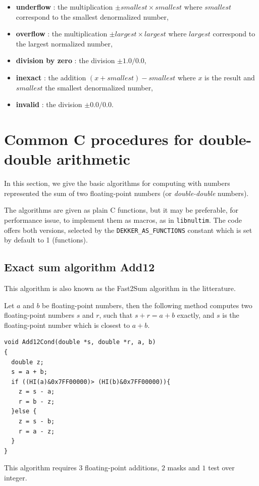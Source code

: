 \begin{itemize}
\item {\bf underflow} : the multiplication $\pm smallest \times smallest$ where $smallest$ correspond to the smallest denormalized number,
\item {\bf overflow} : the multiplication  $\pm largest \times largest$ where $largest$ correspond to the largest normalized number,
\item {\bf division by zero} : the division $\pm 1.0/0.0$,
\item {\bf inexact} : the addition $(x + smallest) - smallest$ where $x$ is the result and  $smallest$ the smallest denormalized number,
\item {\bf invalid} : the division $\pm 0.0/0.0$.
\end{itemize}








\section{Common C procedures for double-double arithmetic\label{section:commonCdoubledouble}}

In this section, we give the basic algorithms for computing with
numbers represented the sum of two floating-point numbers (or
\emph{double-double} numbers). 

The algorithms are given as plain C functions, but it may be
preferable, for performance issue, to implement them as macros, as in
\texttt{libnultim}.  The code offers both versions,
selected by the \texttt{DEKKER\_AS\_FUNCTIONS} constant which is set
by default to 1 (functions).


\subsection{Exact sum algorithm {Add12}}

This algorithm is also known as the Fast2Sum algorithm in the litterature.
\begin{theorem}
  Let $a$ and $b$ be floating-point numbers, then the following method
  computes two floating-point numbers $s$ and $r$, such that $s+r =
  a+b$ exactly, and $s$ is the floating-point number which is closest
  to $a+b$.

\begin{lstlisting}[label={lst:Add12Cond},caption={Add12Cond},firstnumber=1]
void Add12Cond(double *s, double *r, a, b) 
{
  double z;
  s = a + b;            
  if ((HI(a)&0x7FF00000)> (HI(b)&0x7FF00000)){  
    z = s - a;           
    r = b - z;           
  }else {                 
    z = s - b;           
    r = a - z;           
  } 
}                         
\end{lstlisting}
This algorithm requires $3$ floating-point additions, $2$ masks and $1$ test over integer.
\end{theorem}


